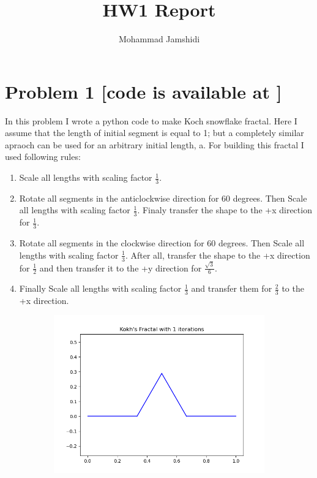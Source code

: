 \documentclass[12pt]{article}
\title{HW1 Report}
\author{Mohammad Jamshidi}
\date{}
\begin{document}
	\maketitle
	\section{Problem 1 [code is available at ]}
	In this problem I wrote a python code to make Koch snowflake fractal. Here I assume that the length of initial segment is equal to 1; but a completely similar apraoch can be used for an arbitrary initial length, a. For building this fractal I used following rules:
	\begin{enumerate}
		\item 
		Scale all lengths with scaling factor $\frac{1}{3}$.
		\item 
		Rotate all segments in the anticlockwise direction for 60 degrees. Then Scale all lengths with scaling factor $\frac{1}{3}$. Finaly transfer the shape to the +x direction for $\frac{1}{3}$.
		\item 
		Rotate all segments in the clockwise direction for 60 degrees. Then Scale all lengths with scaling factor $\frac{1}{3}$. After all, transfer the shape to the +x direction for $\frac{1}{2}$ and then transfer it to the +y direction for $\frac{\sqrt{3}}{6}$.
		\item 
		Finally Scale all lengths with scaling factor $\frac{1}{3}$ and transfer them for $\frac{2}{3}$ to the +x direction.
	\end{enumerate}
	\begin{figure}[ht]
	\begin{subfigure}{0.5\textwidth}
	\includegraphics[width=0.8\linewidth]{1.1.png}
	\end{subfigure}
	\end{figure}
\end{document}
